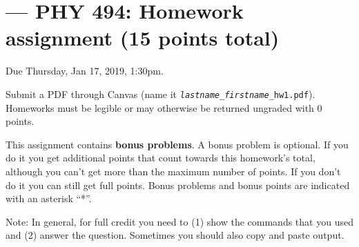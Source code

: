 \documentclass[letterpaper]{scrartcl}
\newcommand{\anumber}{1}
\begin{document}

\setcounter{section}{\anumber}
\addtocounter{section}{-1}
\section{ --- PHY 494: Homework assignment (15 points total)}

\noindent Due Thursday, Jan 17, 2019, 1:30pm.

\noindent Submit a PDF through Canvas (name it
\texttt{\emph{lastname}\_\emph{firstname}\_hw\anumber.pdf}).
Homeworks must be legible or may otherwise be returned ungraded with 0
points.

This assignment contains \textbf{bonus problems}. A bonus problem is
optional. If you do it you get additional points that count towards
this homework's total, although you can't get more than the maximum
number of points. If you don't do it you can still get full
points. Bonus problems and bonus points are indicated with an asterisk
``*''.

Note: In general, for full credit you need to (1) show the commands
that you used and (2) answer the question. Sometimes you should also
copy and paste output.
\end{document}
